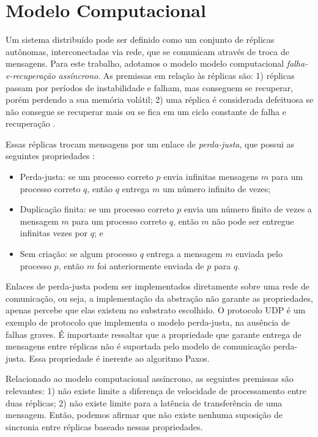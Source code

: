 \section{Modelo Computacional}\label{sec:modelo-computacional}

Um sistema distribuído pode ser definido como um conjunto de réplicas autônomas,
interconectadas via rede, que se comunicam através de troca de mensagens. Para este
trabalho, adotamos o modelo modelo computacional \emph{falha-e-recuperação assíncrono}. As
premissas em relação às réplicas são: 1) réplicas passam por períodos de instabilidade e
falham, mas conseguem se recuperar, porém perdendo a sua memória volátil; 2) uma réplica é
considerada defeituosa se não consegue se recuperar mais ou se fica em um ciclo constante
de falha e recuperação \cite{cachin11}.

Essas réplicas trocam mensagens por um enlace de \emph{perda-justa}, que possui as
seguintes propriedades \cite{cachin11}:

\begin{itemize}
  \item Perda-justa: se um processo correto $p$ envia infinitas mensagens $m$ para um
    processo correto $q$, então $q$ entrega $m$ um número infinito de vezes;
  \item Duplicação finita: se um processo correto $p$ envia um número finito de vezes a
    mensagem $m$ para um processo correto $q$, então $m$ não pode ser entregue infinitas
    vezes por $q$; e
  \item Sem criação: se algum processo $q$ entrega a mensagem $m$ enviada pelo processo
    $p$, então $m$ foi anteriormente enviada de $p$ para $q$.
\end{itemize}

Enlaces de perda-justa podem ser implementados diretamente sobre uma rede de comunicação,
ou seja, a implementação da abstração não garante as propriedades, apenas percebe que elas
existem no substrato escolhido. O protocolo UDP é um exemplo de protocolo que implementa o
modelo perda-justa, na ausência de falhas graves. É importante ressaltar que a propriedade
que garante entrega de mensagens entre réplicas não é suportada pelo modelo de comunicação
perda-justa. Essa propriedade é inerente ao algoritmo Paxos.

Relacionado ao modelo computacional assíncrono, as seguintes premissas são relevantes: 1)
não existe limite a diferença de velocidade de processamento entre duas réplicas; 2) não
existe limite para a latência de transferência de uma mensagem. Então, podemos afirmar que
não existe nenhuma suposição de sincronia entre réplicas baseado nessas propriedades.

